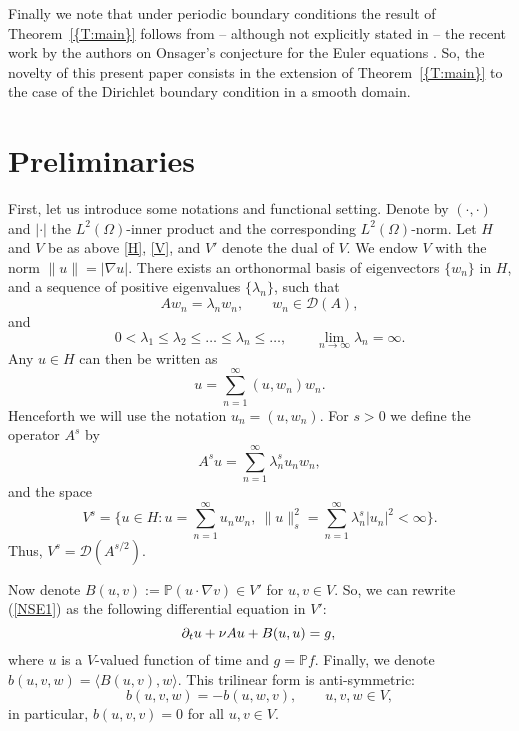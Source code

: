 \documentclass[12pt]{amsart}
\theoremstyle{plain}
\theoremstyle{definition}
\theoremstyle{remark}
\begin{document}
Finally we note that under periodic boundary conditions the result
of {Theorem~\ref{{T:main}}} follows from  -- although not explicitly stated in
-- the recent work by the authors on Onsager's conjecture for the
Euler equations \cite{ccfs}. So, the novelty of this present paper
consists in the extension of {Theorem~\ref{{T:main}}} to the case of the
Dirichlet boundary condition in a smooth domain.

\section{Preliminaries}

First, let us introduce some notations and functional setting.
Denote by $(\cdot,\cdot)$ and $|\cdot|$ the $L^2(\Omega)$-inner product and the
corresponding $L^2(\Omega)$-norm.
Let $H$ and $V$ be as above \eqref{H}, \eqref{V}, and $V'$ denote the dual of $V$.
We endow $V$ with the norm $\|u\| = |{\nabla} u|$.
There exists an orthonormal basis of eigenvectors $\{w_n\}$ in $H$, and a sequence of positive
eigenvalues $\{\lambda_n\}$, such that
\begin{equation}
Aw_n = \lambda_n w_n, \qquad w_n \in \mathcal{D}(A),
\end{equation}
and
\begin{equation}
0<\lambda_1 \leq \lambda_2 \leq \dots \leq \lambda_n \leq \dots,
\qquad \lim_{n \to \infty} \lambda_n = \infty.
\end{equation}
Any $u\in H$ can then be written as
\begin{equation}
u = \sum_{n=1}^\infty (u,w_n) w_n.
\end{equation}
Henceforth we will use the notation $u_n=(u,w_n)$.
For $s>0$ we define the operator $A^s$ by
\begin{equation}
A^{s}u = \sum_{n=1}^\infty \lambda_n^s u_n w_n,
\end{equation}
and the space
\begin{equation}
V^{s}=\{u \in H: u=\sum_{n=1}^\infty u_n w_n,\  \|u\|_s^2 = \sum_{n=1}^\infty \lambda_n^{s} |u_n|^2<\infty \}.
\end{equation}
Thus, $V^{s} = \mathcal{D}(A^{s/2})$.

Now denote $B(u,v):=\mathbb{P}(u \cdot \nabla v)\in V'$ for
$u, v \in V$. So, we can rewrite (\ref{NSE1}) as the following differential
equation in $V'$:
\begin{equation} \label{NSE}
{\partial}_t u + \nu A u +B(u,u) = g,\\
\end{equation}
where $u$ is a $V$-valued function of time and $g = \mathbb{P} f$.
Finally, we denote $b(u,v,w) = \langle B(u,v),w \rangle$.
This trilinear form is anti-symmetric:
\[
b(u,v,w)=-b(u,w,v), \qquad u,v,w \in V,
\]
in particular, $b(u,v,v)=0$ for all $u,v \in V$.
\end{document}
